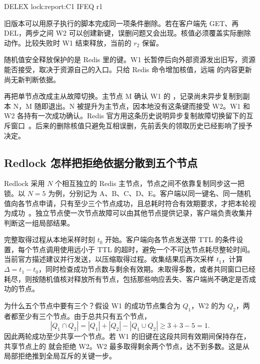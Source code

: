\begin{BookCode}
DELEX lock:report:C1 IFEQ r1
\end{BookCode}

旧版本可以用原子执行的脚本完成同一项条件删除。若在客户端先 GET、再 DEL，两步之间 W2 可以创建新键，误删问题又会出现。核值必须覆盖实际删除动作。比较失败时 W1 结束释放，当前的 \(r_2\) 保留。


随机值安全释放保护的是 Redis 里的键。W1 长暂停后向外部资源发出旧写，资源能否接受，取决于资源自己的入口。只给 Redis 命令增加核值，远端  的内容更新尚无新判断依据。

再把单节点改成主从故障切换。主节点 M 确认 W1 的 ，记录尚未异步复制到副本 N，M 随即退出。N 被提升为主节点，因本地没有这条键而接受 W2。W1 和 W2 各持有一次成功确认。Redis 官方用这条历史说明异步复制故障切换留下的互斥窗口~\cite{redis-redlock}。后来的删除核值只避免互相误删，先前丢失的领取历史已经影响了授予决定。

\subsection*{Redlock 怎样把拒绝依据分散到五个节点}

Redlock 采用 \(N\) 个相互独立的 Redis 主节点，节点之间不依靠复制同步这一把锁。以 \(N=5\) 为例，分别记为 A、B、C、D、E。客户端以同一键名、同一随机值向各节点申请，只有至少三个节点成功，且总耗时符合有效期要求，才把本轮视为成功~\cite{redis-redlock}。独立节点使一次节点故障可以由其他节点提供记录，客户端负责收集并判断这一组局部结果。

完整取得过程从本地采样时刻 \(t_0\) 开始。客户端向各节点发送带 TTL 的条件设置，每个节点调用使用远小于 TTL 的超时，避免一个不可达节点耗尽整轮时间。当前官方描述建议并行发送，以压缩取得过程。收集结果后再次采样 \(t_1\)，计算 \(\Delta=t_1-t_0\)，同时检查成功节点数与剩余有效期。未取得多数，或者共同窗口已经耗尽，则按随机值核对释放所有节点，包括那些响应丢失、客户端尚不确定是否成功的节点。

为什么五个节点中要有三个？假设 W1 的成功节点集合为 \(Q_1\)，W2 的为 \(Q_2\)，两者都至少有三个节点。由于总共只有五个节点，
\[
 |Q_1\cap Q_2|
 =|Q_1|+|Q_2|-|Q_1\cup Q_2|
 \geq 3+3-5=1.
\]
因此两轮成功至少共享一个节点。若 W1 的旧键在这段共同有效期间保持存在，共享节点上的  就会拒绝 W2。W2 最多取得剩余两个节点，达不到多数。这是从局部拒绝推到全局互斥的关键一步。

